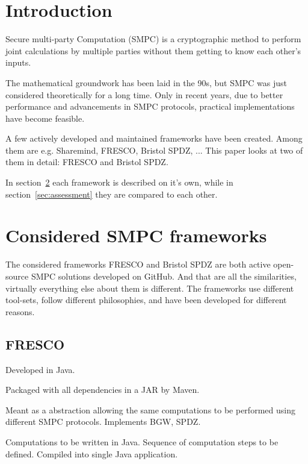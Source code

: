
\section{Introduction}

Secure multi-party Computation (SMPC) is a cryptographic method to perform joint calculations by multiple parties without them getting to know each other's inputs.


The mathematical groundwork has been laid in the 90s, but SMPC was just considered theoretically for a long time.
Only in recent years, due to better performance and advancements in SMPC protocols, practical implementations have become feasible.

A few actively developed and maintained frameworks have been created.
Among them are e.g. Sharemind, FRESCO, Bristol SPDZ, ...
This paper looks at two of them in detail: FRESCO and Bristol SPDZ.

In section~\ref{sec:frameworks} each framework is described on it's own, while in section~\ref{sec:assessment} they are compared to each other.

\section{Considered SMPC frameworks}
\label{sec:frameworks}

The considered frameworks FRESCO and Bristol SPDZ are both active open-source SMPC solutions developed on GitHub.
And that are all the similarities, virtually everything else about them is different.
The frameworks use different tool-sets, follow different philosophies, and have been developed for different reasons.

\subsection{FRESCO}

Developed in Java.

Packaged with all dependencies in a JAR by Maven.

Meant as a abstraction allowing the same computations to be performed using different SMPC protocols.
Implements BGW, SPDZ.


Computations to be written in Java.
Sequence of computation steps to be defined.
Compiled into single Java application.

